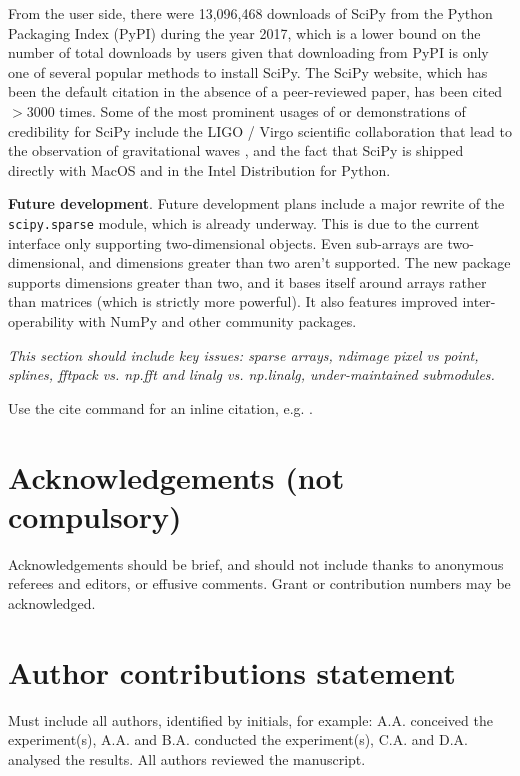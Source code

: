 \documentclass[fleqn,10pt]{wlscirep}
\begin{document}
From the user side, there were 13,096,468 downloads of SciPy from the
Python Packaging Index (PyPI) during the year 2017\cite{pypinfo}, which is
a lower bound on the number of total downloads by users given that downloading
from PyPI is only one of several popular methods to install SciPy.
The SciPy website\cite{SciPylib}, which has been the default citation in the
absence of a peer-reviewed paper, has been cited $>3000$ times. Some of the most
prominent usages of or demonstrations of credibility for SciPy include the LIGO / Virgo
scientific collaboration that lead to the observation of gravitational
waves \cite{PhysRevLett.116.061102}, and the fact that SciPy is shipped directly
with MacOS and in the Intel Distribution for Python\cite{intel-python}. 

\textbf{Future development}.
Future development plans include a major rewrite of the \texttt{scipy.sparse} module, which is already underway\cite{abbasi2018sparse}. This is due to the current interface only supporting two-dimensional objects. Even sub-arrays are two-dimensional, and dimensions greater than two aren't supported. The new package supports dimensions greater than two, and it bases itself around arrays rather than matrices (which is strictly more powerful). It also features improved inter-operability with NumPy and other community packages.

\textit{This section should include key issues: sparse arrays, ndimage pixel vs point, splines, fftpack vs. np.fft and linalg vs. np.linalg, under-maintained submodules.}




\noindent Use the cite command for an inline citation, e.g. \cite{behnel2011cython}.

\section*{Acknowledgements (not compulsory)}

Acknowledgements should be brief, and should not include thanks to anonymous referees and editors, or effusive comments. Grant or contribution numbers may be acknowledged.

\section*{Author contributions statement}

Must include all authors, identified by initials, for example:
A.A. conceived the experiment(s),  A.A. and B.A. conducted the experiment(s), C.A. and D.A. analysed the results.  All authors reviewed the manuscript.
\end{document}
